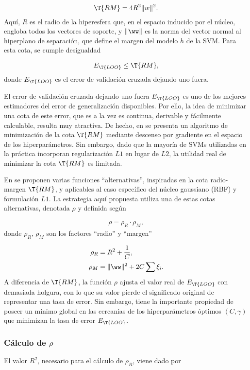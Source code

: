 \begin{align}
  \T{RM} = 4R^2 \|w\|^2.
\end{align}
Aquí, $R$ es el radio de la hiperesfera que, en el espacio inducido
por el núcleo, engloba todos los vectores de soporte, y $\|\ww\|$ es
la norma del vector normal al hiperplano de separación, que define el
margen del modelo $h$ de la SVM.  Para esta cota, se cumple
desigualdad

\begin{align}
  E_{\T{LOO}} \leq \T{RM},
\end{align}
donde $E_{\T{LOO}}$ es el error de validación cruzada dejando uno
fuera.

El error de validación cruzada dejando uno fuera $E_{\T{LOO}}$ es uno
de los mejores estimadores del error de generalización disponibles.
Por ello, la idea de minimizar una cota de este error, que es a la vez
es continua, derivable y fácilmente calculable, resulta muy atractiva.
De hecho, en \cite{chapelle} se presenta un algoritmo de minimización
de la cota $\T{RM}$ mediante descenso por gradiente en el espacio de
los hiperparámetros.  Sin embargo, dado que la mayoría de SVMs
utilizadas en la práctica incorporan regularización $L1$ en lugar de
$L2$, la utilidad real de minimizar la cota $\T{RM}$ es limitada.

En \cite{chung} se proponen varias funciones ``alternativas'',
inspiradas en la cota radio-margen $\T{RM}$, y aplicables al caso
específico del núcleo gaussiano (RBF) y formulación $L1$. La
estrategia aquí propuesta utiliza una de estas cotas
alternativas, denotada $\rho$ y definida según

\begin{align}
  \rho = \rho_R \cdot \rho_M,
\end{align}
donde $\rho_R$, $\rho_M$ son los factores ``radio'' y ``margen''

\begin{align}
  \rho_R &= R^2+\frac{1}{C}, \\
  \rho_M &= \|\ww\|^2+2C\sum\xi_i.
\end{align}
A diferencia de $\T{RM}$, la función $\rho$ ajusta el valor
real de $E_{\T{LOO}}$ con demasiada holgura, con lo que su valor
pierde el significado original de representar una tasa de error. Sin
embargo, tiene la importante propiedad de poseer un mínimo global en
las cercanías de los hiperparámetros óptimos $(C,\gamma)$ que
minimizan la tasa de error $E_{\T{LOO}}$.

\subsubsection{Cálculo de $\rho$}
El valor $R^2$, necesario para el cálculo de $\rho_R$, viene dado por

